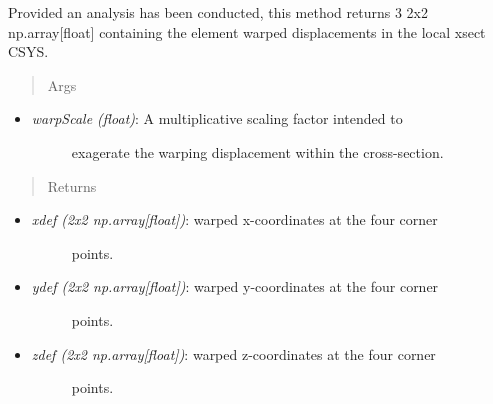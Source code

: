 \documentclass[letterpaper,10pt,english]{sphinxmanual}
\begin{document}
\begin{fulllineitems}
\begin{fulllineitems}
Provided an analysis has been conducted, this method
returns 3 2x2 np.array{[}float{]} containing the element warped
displacements in the local xsect CSYS.
\begin{quote}\begin{description}
\item[{Args}] \leavevmode
\end{description}\end{quote}
\begin{itemize}
\item {} \begin{description}
\item[{\emph{warpScale (float)}: A multiplicative scaling factor intended to}] \leavevmode
exagerate the warping displacement within the cross-section.

\end{description}

\end{itemize}
\begin{quote}\begin{description}
\item[{Returns}] \leavevmode
\end{description}\end{quote}
\begin{itemize}
\item {} \begin{description}
\item[{\emph{xdef (2x2 np.array{[}float{]})}: warped x-coordinates at the four corner}] \leavevmode
points.

\end{description}

\item {} \begin{description}
\item[{\emph{ydef (2x2 np.array{[}float{]})}: warped y-coordinates at the four corner}] \leavevmode
points.

\end{description}

\item {} \begin{description}
\item[{\emph{zdef (2x2 np.array{[}float{]})}: warped z-coordinates at the four corner}] \leavevmode
points.

\end{description}

\end{itemize}


\end{fulllineitems}
\end{fulllineitems}
\end{document}
